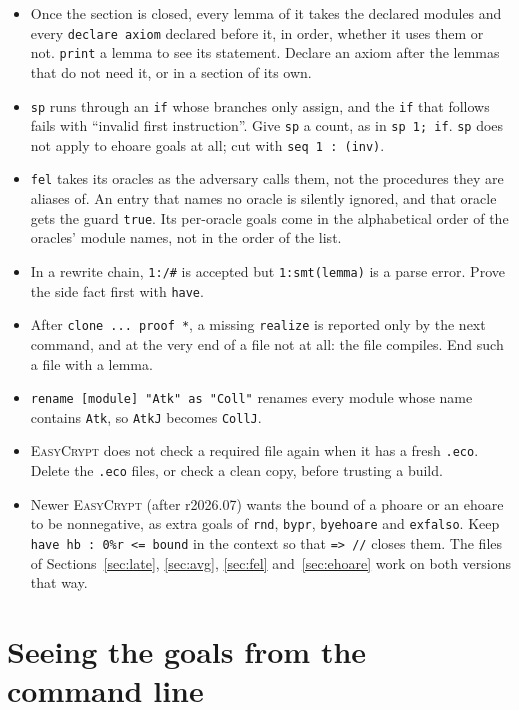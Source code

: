 \documentclass[10pt,a4paper]{article}
\newcommand{\ec}{\lstinline[basicstyle=\small\ttfamily]}
\newcommand{\EC}{\textsc{EasyCrypt}}
\begin{document}
\begin{itemize}
    Name parameters \ec|x0| or \ec|xx|.
  \item Once the section is closed, every lemma of it takes the declared modules and every \ec|declare axiom| declared before it, in order, whether it uses them or not.
    \ec|print| a lemma to see its statement.
    Declare an axiom after the lemmas that do not need it, or in a section of its own.
  \item \ec|sp| runs through an \ec|if| whose branches only assign, and the \ec|if| that follows fails with ``invalid first instruction''.
    Give \ec|sp| a count, as in \ec|sp 1; if|.
    \ec|sp| does not apply to ehoare goals at all; cut with \ec|seq 1 : (inv)|.
  \item \ec|fel| takes its oracles as the adversary calls them, not the procedures they are aliases of.
    An entry that names no oracle is silently ignored, and that oracle gets the guard \ec|true|.
    Its per-oracle goals come in the alphabetical order of the oracles' module names, not in the order of the list.
  \item In a rewrite chain, \ec|1:/#| is accepted but \ec|1:smt(lemma)| is a parse error.
    Prove the side fact first with \ec|have|.
  \item After \ec|clone ... proof *|, a missing \ec|realize| is reported only by the next command, and at the very end of a file not at all: the file compiles.
    End such a file with a lemma.
  \item \ec|rename [module] "Atk" as "Coll"| renames every module whose name contains \ec|Atk|, so \ec|AtkJ| becomes \ec|CollJ|.
  \item \EC{} does not check a required file again when it has a fresh \ec|.eco|.
    Delete the \ec|.eco| files, or check a clean copy, before trusting a build.
  \item Newer \EC{} (after r2026.07) wants the bound of a phoare or an ehoare to be nonnegative, as extra goals of \ec|rnd|, \ec|bypr|, \ec|byehoare| and \ec|exfalso|.
    Keep \ec|have hb : 0%
    The files of Sections~\ref{sec:late}, \ref{sec:avg}, \ref{sec:fel} and~\ref{sec:ehoare} work on both versions that way.
\end{itemize}

\section{Seeing the goals from the command line}\label{sec:llm}
\end{document}
